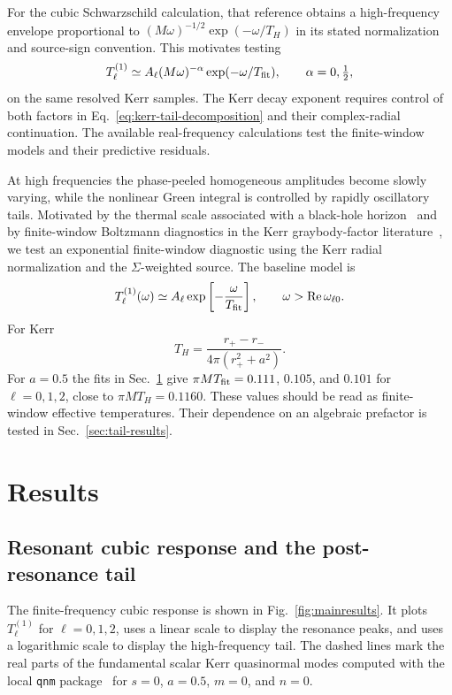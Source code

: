 \documentclass[aps,prd,twocolumn,10pt,nofootinbib,superscriptaddress,floatfix]{revtex4-2}
\newcommand{\rp}{r_+}
\newcommand{\rmn}{r_-}
\begin{document}
For the cubic Schwarzschild calculation, that reference obtains a
high-frequency envelope proportional to
$(M\omega)^{-1/2}\exp(-\omega/T_H)$ in its stated normalization and
source-sign convention.  This motivates testing
\begin{equation}
T^{(1)}_\ell\simeq A_\ell(M\omega)^{-\alpha}
\exp(-\omega/T_{\rm fit}),\qquad \alpha=0,\tfrac12,
\label{eq:tail-prefactor-model}
\end{equation}
on the same resolved Kerr samples.  The Kerr decay exponent requires
control of both factors in Eq.~\eqref{eq:kerr-tail-decomposition} and their
complex-radial continuation.  The available real-frequency calculations
test the finite-window models and their predictive residuals.

At high frequencies the phase-peeled homogeneous amplitudes become slowly
varying, while the nonlinear Green integral is controlled by rapidly
oscillatory tails.  Motivated by the thermal scale associated with a black-hole
horizon~\cite{Hawking1975} and by finite-window Boltzmann diagnostics in the
Kerr graybody-factor literature~\cite{Oshita2023,Oshita2024},
we test an exponential finite-window diagnostic using the Kerr radial
normalization and the $\Sigma$-weighted source.  The baseline model is
\begin{equation}
T_\ell^{(1)}(\omega)\simeq
A_\ell\exp\left[-\frac{\omega}{T_{\rm fit}}\right],
\qquad
\omega>\operatorname{Re}\omega_{\ell0}.
\label{eq:boltzmann}
\end{equation}
For Kerr
\begin{equation}
T_H=\frac{\rp-\rmn}{4\pi(\rp^2+a^2)}.
\end{equation}
For $a=0.5$ the fits in Sec.~\ref{sec:results} give
$\pi M T_{\rm fit}=0.111$, $0.105$, and $0.101$ for
$\ell=0,1,2$, close to $\pi M T_H=0.1160$.  These values should be read as
finite-window effective temperatures.  Their dependence on an algebraic
prefactor is tested in Sec.~\ref{sec:tail-results}.


\section{Results}
\label{sec:results}
\subsection{Resonant cubic response and the post-resonance tail}
\label{sec:resonance-results}
The finite-frequency cubic response is shown in
Fig.~\ref{fig:mainresults}.  It plots $T_\ell^{(1)}$ for $\ell=0,1,2$, uses a
linear scale to display the resonance peaks, and uses a logarithmic scale to
display the high-frequency tail.  The dashed lines mark the real parts of the
fundamental scalar Kerr quasinormal modes computed with the local
\texttt{qnm} package~\cite{Stein2019} for $s=0$, $a=0.5$, $m=0$, and $n=0$.
\end{document}
